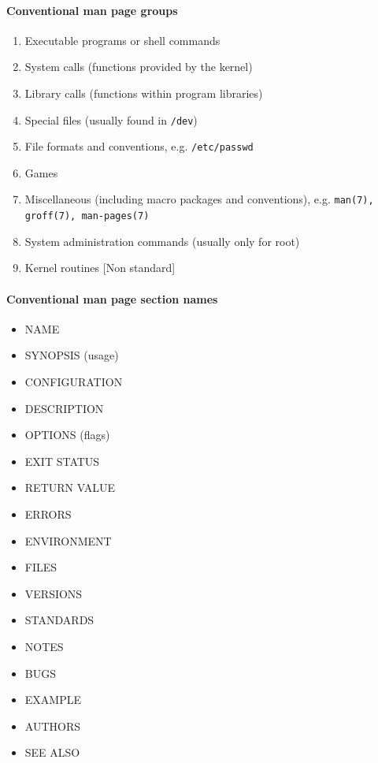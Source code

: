 \label{a:man}

\paragraph{Conventional man page groups}
\begin{enumerate}
  \item Executable programs or shell commands
  \item System calls (functions provided by the kernel)
  \item Library calls (functions within program libraries)
  \item Special files (usually found in \texttt{/dev})
  \item File formats and conventions, e.g. \texttt{/etc/passwd}
  \item Games
  \item Miscellaneous (including macro packages and conventions),
      e.g. \texttt{man(7), groff(7), man-pages(7)}
  \item System administration commands (usually only for root)
  \item Kernel routines [Non standard]
\end{enumerate}

\paragraph{Conventional man page section names}
\begin{itemize}
  \item NAME
  \item SYNOPSIS (usage)
  \item CONFIGURATION
  \item DESCRIPTION
  \item OPTIONS (flags)
  \item EXIT STATUS
  \item RETURN VALUE
  \item ERRORS
  \item ENVIRONMENT
  \item FILES
  \item VERSIONS
  \item STANDARDS
  \item NOTES
  \item BUGS
  \item EXAMPLE
  \item AUTHORS
  \item SEE ALSO
\end{itemize}
